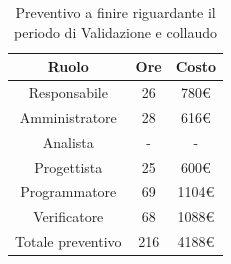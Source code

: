 \begin{table}[H]
	\centering
	\renewcommand{\arraystretch}{1.5}
	\begin{tabular}{|c|c|c|}
		\hline
		\rowcolor{lighter-grayer}
		Ruolo & Ore & Costo \\ \hline
		Responsabile & 26 & 780\euro \\ \hline
		Amministratore & 28 & 616\euro \\ \hline
		Analista & - & - \\ \hline
		Progettista & 25 & 600\euro \\ \hline
		Programmatore & 69 & 1104\euro \\ \hline
		Verificatore & 68 & 1088\euro \\ \hline
		Totale preventivo & 216 & 4188\euro \\ \hline
	\end{tabular}
	\caption{ Preventivo a finire riguardante il periodo di Validazione e collaudo\\}
\end{table}
